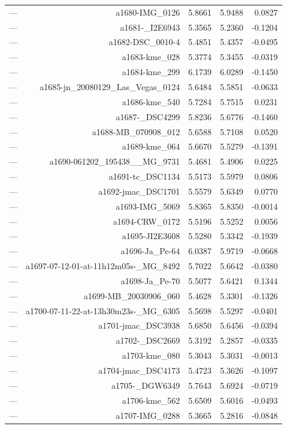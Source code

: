 \begin{table}[htbp]
\begin{tabular}{lrrrr}
— & a1680-IMG_0126 & 5.8661 & 5.9488 & 0.0827 \\
— & a1681-_I2E6943 & 5.3565 & 5.2360 & -0.1204 \\
— & a1682-DSC_0010-4 & 5.4851 & 5.4357 & -0.0495 \\
— & a1683-kme_028 & 5.3774 & 5.3455 & -0.0319 \\
— & a1684-kme_299 & 6.1739 & 6.0289 & -0.1450 \\
— & a1685-jn_20080129_Las_Vegas_0124 & 5.6484 & 5.5851 & -0.0633 \\
— & a1686-kme_540 & 5.7284 & 5.7515 & 0.0231 \\
— & a1687-_DSC4299 & 5.8236 & 5.6776 & -0.1460 \\
— & a1688-MB_070908_012 & 5.6588 & 5.7108 & 0.0520 \\
— & a1689-kme_064 & 5.6670 & 5.5279 & -0.1391 \\
— & a1690-061202_195438__MG_9731 & 5.4681 & 5.4906 & 0.0225 \\
— & a1691-tc_DSC1134 & 5.5173 & 5.5979 & 0.0806 \\
— & a1692-jmac_DSC1701 & 5.5579 & 5.6349 & 0.0770 \\
— & a1693-IMG_5069 & 5.8365 & 5.8350 & -0.0014 \\
— & a1694-CRW_0172 & 5.5196 & 5.5252 & 0.0056 \\
— & a1695-JI2E3608 & 5.5280 & 5.3342 & -0.1939 \\
— & a1696-Ja_Pe-64 & 6.0387 & 5.9719 & -0.0668 \\
— & a1697-07-12-01-at-11h12m05s-_MG_8492 & 5.7022 & 5.6642 & -0.0380 \\
— & a1698-Ja_Pe-70 & 5.5077 & 5.6421 & 0.1344 \\
— & a1699-MB_20030906_060 & 5.4628 & 5.3301 & -0.1326 \\
— & a1700-07-11-22-at-13h30m23s-_MG_6305 & 5.5698 & 5.5297 & -0.0401 \\
— & a1701-jmac_DSC3938 & 5.6850 & 5.6456 & -0.0394 \\
— & a1702-_DSC2669 & 5.3192 & 5.2857 & -0.0335 \\
— & a1703-kme_080 & 5.3043 & 5.3031 & -0.0013 \\
— & a1704-jmac_DSC4173 & 5.4723 & 5.3626 & -0.1097 \\
— & a1705-_DGW6349 & 5.7643 & 5.6924 & -0.0719 \\
— & a1706-kme_562 & 5.6509 & 5.6016 & -0.0493 \\
— & a1707-IMG_0288 & 5.3665 & 5.2816 & -0.0848 \\

\end{tabular}
\end{table}
